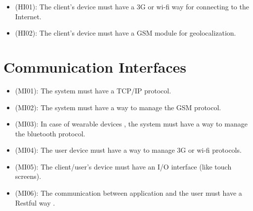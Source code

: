 \documentclass[a4paper]{book}
\begin{document}
\begin{itemize}
\item (HI01): The client's device must have a 3G or wi-fi way for connecting to the Internet.
\item (HI02): The client's device must have a GSM module for geolocalization. 
\end{itemize}

\section{Communication Interfaces}

\begin{itemize}
\item (MI01): The system must have a TCP/IP protocol.
\item (MI02): The system must have a way to manage the GSM protocol.
\item (MI03): In case of wearable devices , the system must have a way to manage the bluetooth protocol.
\item (MI04): The user device must have a way to manage 3G or wi-fi protocols.
\item (MI05): The client/user's device must have an I/O interface (like touch screens).
\item (MI06): The communication between application and the user must have a Restful way .
\end{itemize}
\end{document}
